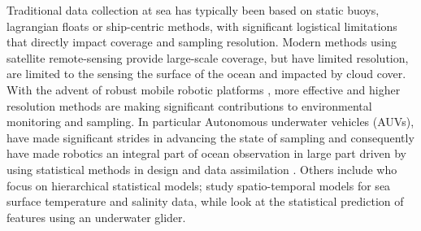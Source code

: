 \documentclass[aoas]{imsart}
\begin{document}
Traditional data collection at sea has typically been based on static
buoys, lagrangian floats or ship-centric methods, with significant
logistical limitations that directly impact coverage and sampling
resolution. Modern methods using satellite remote-sensing provide
large-scale coverage, but have limited resolution, are limited to the
sensing the surface of the ocean and impacted by cloud cover. With the
advent of robust mobile robotic platforms \cite{Bellingham07}, more
effective and higher resolution methods are making significant
contributions to environmental monitoring and sampling. 
In particular Autonomous underwater vehicles (AUVs), have made
significant strides in advancing the state of sampling
and consequently have made robotics an integral part of ocean
observation in large part driven by using 
statistical methods in design and data assimilation
\cite{das11b,Graham2013,Das2015,das15,fossuminformation,fossum18b}.%
Others include \cite{wikle2013modern} who %
focus on hierarchical statistical models; \cite{sahu2008space} study
spatio-temporal models for sea surface temperature and salinity data,
while
\cite{mellucci2018oceanic} look at the statistical prediction of
features using an underwater glider.
\end{document}
